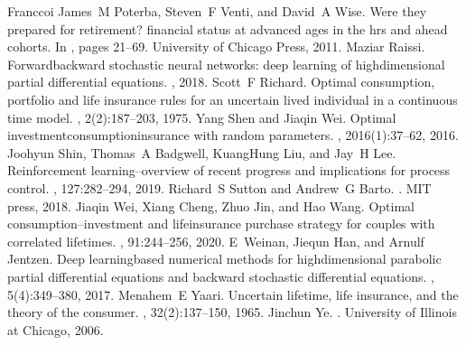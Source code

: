 \documentclass[letterpaper,10pt,english]{jupyterBook}
\begin{document}
\begin{sphinxthebibliography}{Franccoi}
\sphinxAtStartPar
James M Poterba, Steven F Venti, and David A Wise. Were they prepared for retirement? financial status at advanced ages in the hrs and ahead cohorts. In , pages 21–69. University of Chicago Press, 2011.
\sphinxAtStartPar
Maziar Raissi. Forward\sphinxhyphen{}backward stochastic neural networks: deep learning of high\sphinxhyphen{}dimensional partial differential equations. , 2018.
\sphinxAtStartPar
Scott F Richard. Optimal consumption, portfolio and life insurance rules for an uncertain lived individual in a continuous time model. , 2(2):187–203, 1975.
\sphinxAtStartPar
Yang Shen and Jiaqin Wei. Optimal investment\sphinxhyphen{}consumption\sphinxhyphen{}insurance with random parameters. , 2016(1):37–62, 2016.
\sphinxAtStartPar
Joohyun Shin, Thomas A Badgwell, Kuang\sphinxhyphen{}Hung Liu, and Jay H Lee. Reinforcement learning–overview of recent progress and implications for process control. , 127:282–294, 2019.
\sphinxAtStartPar
Richard S Sutton and Andrew G Barto. . MIT press, 2018.
\sphinxAtStartPar
Jiaqin Wei, Xiang Cheng, Zhuo Jin, and Hao Wang. Optimal consumption–investment and life\sphinxhyphen{}insurance purchase strategy for couples with correlated lifetimes. , 91:244–256, 2020.
\sphinxAtStartPar
E Weinan, Jiequn Han, and Arnulf Jentzen. Deep learning\sphinxhyphen{}based numerical methods for high\sphinxhyphen{}dimensional parabolic partial differential equations and backward stochastic differential equations. , 5(4):349–380, 2017.
\sphinxAtStartPar
{}
\sphinxAtStartPar
Menahem E Yaari. Uncertain lifetime, life insurance, and the theory of the consumer. , 32(2):137–150, 1965.
\sphinxAtStartPar
Jinchun Ye. . University of Illinois at Chicago, 2006.
\end{sphinxthebibliography}







\renewcommand{\indexname}{Index}
\printindex
\end{document}
